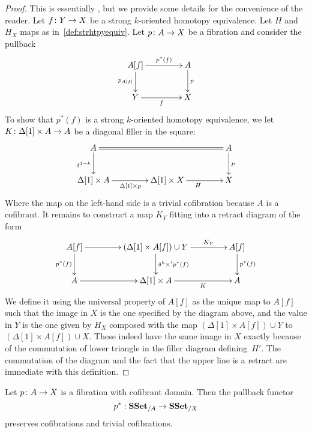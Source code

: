 \documentclass[reqno,10pt,a4paper,oneside,draft]{amsart}
\begin{document}
\begin{proof} This is essentially \cite[Lemma~3.7]{gambino2017frobenius}, but we provide some details
for the convenience of the reader.
Let $f \colon Y \rightarrow X$ be a strong $k$-oriented homotopy equivalence. Let $H$ and $H_X$  maps 
as in~\cref{def:strhtpyequiv}. Let $p \colon A \rightarrow X$ be a fibration and consider the pullback
\[
\xymatrix@C=1.5cm{
A[f] \ar[r]^-{p^*(f)}  \ar[d]_{p_{A[f]}} & A \ar[d]^{p} \\
Y \ar[r]_{f} & X \\
}
\] 
To show that $p^*(f)$ is a strong $k$-oriented homotopy equivalence, we let $K \colon \Delta[1] \times A \rightarrow A$ be a diagonal filler in the square:
\[
\xymatrix@C=1.5cm{
A \ar[d]_{\delta^{1-k}} \ar@{=}[rr] & & A \ar[d]^p \\ 
\Delta[1] \times A \ar[r]_{\Delta[1] \times p}  & \Delta[1] \times X \ar[r]_H & X
}\]
Where the map on the left-hand side is a trivial cofibration because $A$ is a cofibrant.
It remains to construct a map $K_Y$  fitting into a retract diagram of the form
\[
\xymatrix@C=1.5cm{
A[f]  \ar[d]_{p^*(f)} \ar[r] &  (\Delta[1] \times A[f])  \cup Y \ar[d]^{\delta^k \times' p^*(f)} \ar[r]^-{K_Y} & A[f] \ar[d]^{p^*(f)} \\
A \ar[r] & \Delta[1]  \times A \ar[r]_-{K} & A
}
\]
We define it using the universal property of $A[f]$ as the unique map to $A[f]$ such that the image in $X$ is the one specified by the diagram above, and the value in $Y$ is the one given by $H_X$ composed with the map $(\Delta[1] \times A[f]) \cup Y$ to $(\Delta[1] \times A[f]) \cup X$. These indeed have the same image in $X$ exactly because of the commutation of lower triangle in the filler diagram defining~$H'$. The commutation of the diagram and the fact that the upper line is a retract are immediate with this definition.
\end{proof}



\begin{proposition}\label{prop:Frobenius}
Let $p \colon A \rightarrow X$ is a fibration with cofibrant domain. Then the pullback functor 
\[
p^* : \mathbf{SSet}_{/A} \rightarrow \mathbf{SSet}_{/X}
\] 
preserves cofibrations and trivial cofibrations.
\end{proposition}
\end{document}
